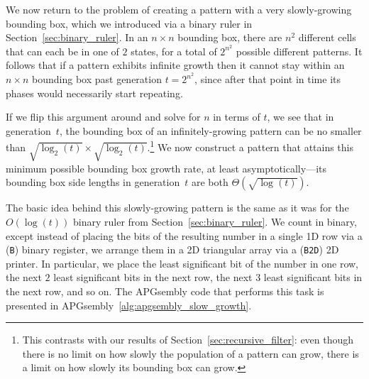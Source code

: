 
We now return to the problem of creating a pattern with a very slowly-growing bounding box, which we introduced via a binary ruler in Section~\ref{sec:binary_ruler}. In an $n \times n$ bounding box, there are $n^2$ different cells that can each be in one of $2$ states, for a total of $2^{n^2}$ possible different patterns. It follows that if a pattern exhibits infinite growth then it cannot stay within an $n \times n$ bounding box past generation $t = 2^{n^2}$, since after that point in time its phases would necessarily start repeating.

If we flip this argument around and solve for $n$ in terms of $t$, we see that in generation~$t$, the bounding box of an infinitely-growing pattern can be no smaller than $\sqrt{\log_2(t)} \times \sqrt{\log_2(t)}$.\footnote{This contrasts with our results of Section~\ref{sec:recursive_filter}: even though there is no limit on how slowly the population of a pattern can grow, there is a limit on how slowly its bounding box can grow.} We now construct a pattern that attains this minimum possible bounding box growth rate, at least asymptotically---its bounding box side lengths in generation~$t$ are both $\Theta(\sqrt{\log(t)})$.

The basic idea behind this slowly-growing pattern is the same as it was for the $O(\log(t))$ binary ruler from Section~\ref{sec:binary_ruler}. We count in binary, except instead of placing the bits of the resulting number in a single 1D row via a (\texttt{B}) binary register, we arrange them in a 2D triangular array via a (\texttt{B2D}) 2D printer. In particular, we place the least significant bit of the number in one row, the next $2$ least significant bits in the next row, the next $3$ least significant bits in the next row, and so on. The APGsembly code that performs this task is presented in APGsembly~\ref{alg:apgsembly_slow_growth}.

